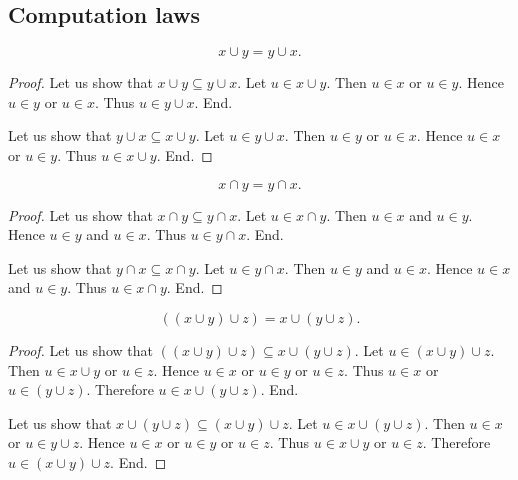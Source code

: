 \documentclass[../../sets-and-functions.ftl.tex]{subfiles}
\begin{document}
  \subsection{Computation laws}

  \begin{forthel}
    \begin{proposition}\label{SetTheory_01_01_830899}
      \[ x \cup y = y \cup x. \]
    \end{proposition}
    \begin{proof}
      Let us show that $x \cup y \subseteq y \cup x$.
        Let $u \in x \cup y$.
        Then $u \in x$ or $u \in y$.
        Hence $u \in y$ or $u \in x$.
        Thus $u \in y \cup x$.
      End.

      Let us show that $y \cup x \subseteq x \cup y$.
        Let $u \in y \cup x$.
        Then $u \in y$ or $u \in x$.
        Hence $u \in x$ or $u \in y$.
        Thus $u \in x \cup y$.
      End.
    \end{proof}


    \begin{proposition}\label{SetTheory_01_01_728823}
      \[ x \cap y = y \cap x. \]
    \end{proposition}
    \begin{proof}
      Let us show that $x \cap y \subseteq y \cap x$.
        Let $u \in x \cap y$.
        Then $u \in x$ and $u \in y$.
        Hence $u \in y$ and $u \in x$.
        Thus $u \in y \cap x$.
      End.

      Let us show that $y \cap x \subseteq x \cap y$.
        Let $u \in y \cap x$.
        Then $u \in y$ and $u \in x$.
        Hence $u \in x$ and $u \in y$.
        Thus $u \in x \cap y$.
      End.
    \end{proof}

    \begin{proposition}\label{SetTheory_01_01_665069}
      \[ ((x \cup y) \cup z) = x \cup (y \cup z). \]
    \end{proposition}
    \begin{proof}
      Let us show that $((x \cup y) \cup z) \subseteq x \cup (y \cup z)$.
        Let $u \in (x \cup y) \cup z$.
        Then $u \in x \cup y$ or $u \in z$.
        Hence $u \in x$ or $u \in y$ or $u \in z$.
        Thus $u \in x$ or $u \in (y \cup z)$.
        Therefore $u \in x \cup (y \cup z)$.
      End.

      Let us show that $x \cup (y \cup z) \subseteq (x \cup y) \cup z$.
        Let $u \in x \cup (y \cup z)$.
        Then $u \in x$ or $u \in y \cup z$.
        Hence $u \in x$ or $u \in y$ or $u \in z$.
        Thus $u \in x \cup y$ or $u \in z$.
        Therefore $u \in (x \cup y) \cup z$.
      End.
    \end{proof}



\end{forthel}
\end{document}
